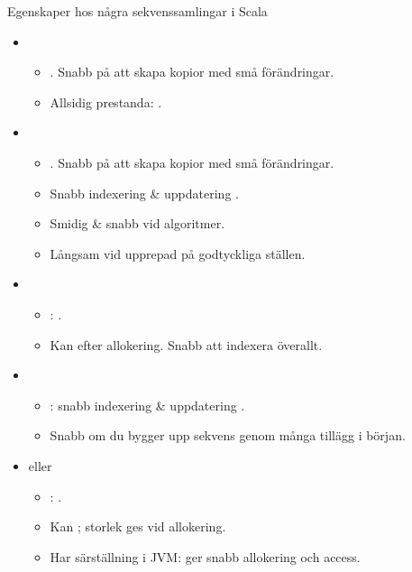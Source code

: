\begin{Slide}{Egenskaper hos några sekvenssamlingar i Scala}
\vspace{-0.5em}
\begin{itemize}\SlideFontSmall

\item {}
  \begin{itemize}\SlideFontSmall
  \item {}. Snabb på att skapa kopior med små förändringar.
  \item Allsidig prestanda: .
  \end{itemize}

\item {}
  \begin{itemize}\SlideFontSmall
  \item {}. Snabb på att skapa kopior med små förändringar.
  \item Snabb indexering \& uppdatering .
  \item Smidig \& snabb vid  algoritmer.
  \item Långsam vid upprepad  på godtyckliga ställen.
  \end{itemize}

\item {}
  \begin{itemize}\SlideFontSmall
  \item {}: .
  \item Kan  efter allokering. Snabb att indexera överallt.
  \end{itemize}

\item {}
  \begin{itemize}\SlideFontSmall
  \item {}: snabb indexering \& uppdatering .
  \item Snabb om du bygger upp sekvens genom många tillägg i början.
  \end{itemize}

\item {} eller 
  \begin{itemize}\SlideFontSmall
  \item {}: .
  \item Kan ; storlek ges vid allokering.
  \item Har särställning i JVM: ger snabb allokering och access.
  \end{itemize}

\end{itemize}
\end{Slide}

